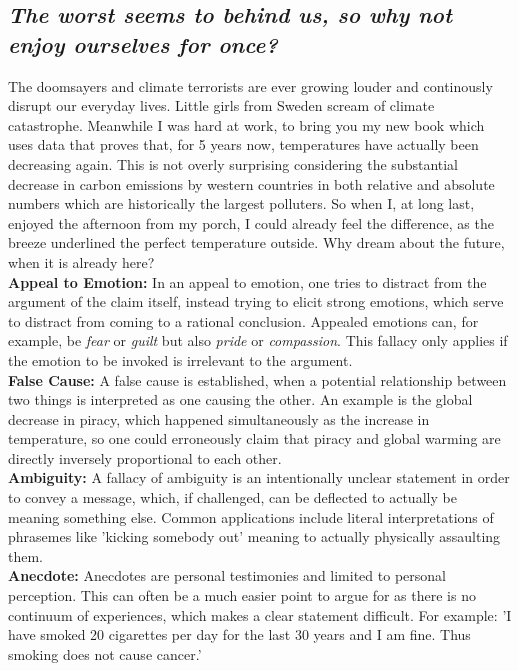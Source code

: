 \documentclass{article}
\begin{document}
\begin{multicols}{3}
	\subsection*{\textit{The worst seems to behind us, so why not enjoy ourselves for once?}}
	\Large
	The doomsayers and climate terrorists are ever growing louder and continously disrupt our everyday lives. Little girls from Sweden scream of climate catastrophe. Meanwhile I was hard at work, to bring you my new book which uses data that proves that, for 5 years now, temperatures have actually been decreasing again. This is not overly surprising considering the substantial decrease in carbon emissions by western countries in both relative and absolute numbers which are historically the largest polluters. So when I, at long last, enjoyed the afternoon from my porch, I could already feel the difference, as the breeze underlined the perfect temperature outside. Why dream about the future, when it is already here? \\
	\columnbreak
	\normalsize
	\textbf{Appeal to Emotion:} In an appeal to emotion, one tries to distract from the argument of the claim itself, instead trying to elicit strong emotions, which serve to distract from coming to a rational conclusion. Appealed emotions can, for example, be \textit{fear} or \textit{guilt} but also \textit{pride} or \textit{compassion}. This fallacy only applies if the emotion to be invoked is irrelevant to the argument.\\
	\textbf{False Cause:} A false cause is established, when a potential relationship between two things is interpreted as one causing the other. An example is the global decrease in piracy, which happened simultaneously as the increase in temperature, so one could erroneously claim that piracy and global warming are directly inversely proportional to each other.\\
	\textbf{Ambiguity:} A fallacy of ambiguity is an intentionally unclear statement in order to convey a message, which, if challenged, can be deflected to actually be meaning something else. Common applications include literal interpretations of phrasemes like 'kicking somebody out' meaning to actually physically assaulting them.\\
	\textbf{Anecdote:} Anecdotes are personal testimonies and limited to personal perception. This can often be a much easier point to argue for as there is no continuum of experiences, which makes a clear statement difficult. For example: 'I have smoked 20 cigarettes per day for the last 30 years and I am fine. Thus smoking does not cause cancer.'\\
\end{multicols}
\end{document}
